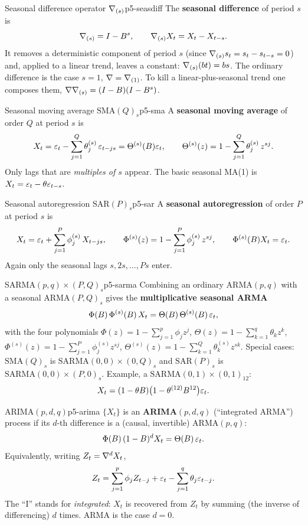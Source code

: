 \begin{definition}{Seasonal difference operator $\nabla_{(s)}$}{p5-seasdiff}
The \textbf{seasonal difference} of period $s$ is
\[
\nabla_{(s)}=I-B^{s},\qquad \nabla_{(s)}X_t=X_t-X_{t-s}.
\]
It removes a deterministic component of period $s$ (since
$\nabla_{(s)}s_t=s_t-s_{t-s}=0$) and, applied to a linear trend, leaves a
constant: $\nabla_{(s)}(bt)=bs$. The ordinary difference is the case $s=1$,
$\nabla=\nabla_{(1)}$. To kill a linear-plus-seasonal trend one composes them,
$\nabla\nabla_{(s)}=(I-B)(I-B^{s})$.
\end{definition}

\begin{definition}{Seasonal moving average $\mathrm{SMA}(Q)_s$}{p5-sma}
A \textbf{seasonal moving average} of order $Q$ at period $s$ is
\[
X_t=\varepsilon_t-\sum_{j=1}^{Q}\theta^{(s)}_j\,\varepsilon_{t-js}
=\Theta^{(s)}(B)\varepsilon_t,
\qquad
\Theta^{(s)}(z)=1-\sum_{j=1}^{Q}\theta^{(s)}_j\,z^{sj}.
\]
Only lags that are \emph{multiples of $s$} appear. The basic seasonal MA(1) is
$X_t=\varepsilon_t-\theta\varepsilon_{t-s}$.
\end{definition}

\begin{definition}{Seasonal autoregression $\mathrm{SAR}(P)_s$}{p5-sar}
A \textbf{seasonal autoregression} of order $P$ at period $s$ is
\[
X_t=\varepsilon_t+\sum_{j=1}^{P}\phi^{(s)}_j\,X_{t-js},
\qquad
\Phi^{(s)}(z)=1-\sum_{j=1}^{P}\phi^{(s)}_j\,z^{sj},
\qquad
\Phi^{(s)}(B)X_t=\varepsilon_t .
\]
Again only the seasonal lags $s,2s,\dots,Ps$ enter.
\end{definition}

\begin{definition}{SARMA$(p,q)\times(P,Q)_s$}{p5-sarma}
Combining an ordinary $\mathrm{ARMA}(p,q)$ with a seasonal
$\mathrm{ARMA}(P,Q)_s$ gives the \textbf{multiplicative seasonal ARMA}
\[
\Phi(B)\,\Phi^{(s)}(B)\,X_t=\Theta(B)\,\Theta^{(s)}(B)\,\varepsilon_t,
\]
with the four polynomials
\(\Phi(z)=1-\sum_{j=1}^p\phi_jz^j\),
\(\Theta(z)=1-\sum_{k=1}^q\theta_kz^k\),
\(\Phi^{(s)}(z)=1-\sum_{j=1}^P\phi^{(s)}_jz^{sj}\),
\(\Theta^{(s)}(z)=1-\sum_{k=1}^Q\theta^{(s)}_kz^{sk}\).
Special cases: $\mathrm{SMA}(Q)_s$ is $\mathrm{SARMA}(0,0)\times(0,Q)_s$ and
$\mathrm{SAR}(P)_s$ is $\mathrm{SARMA}(0,0)\times(P,0)_s$. Example, a
$\mathrm{SARMA}(0,1)\times(0,1)_{12}$:
\[
X_t=(1-\theta B)\bigl(1-\theta^{(12)}B^{12}\bigr)\varepsilon_t .
\]
\end{definition}

\begin{definition}{ARIMA$(p,d,q)$}{p5-arima}
$\{X_t\}$ is an \textbf{ARIMA$(p,d,q)$} (``integrated ARMA'') process if its
$d$-th difference is a (causal, invertible) $\mathrm{ARMA}(p,q)$:
\[
\Phi(B)\,(1-B)^{d}X_t=\Theta(B)\,\varepsilon_t .
\]
Equivalently, writing $Z_t=\nabla^{d}X_t$,
\[
Z_t=\sum_{j=1}^{p}\phi_jZ_{t-j}+\varepsilon_t-\sum_{j=1}^{q}\theta_j\varepsilon_{t-j}.
\]
The ``I'' stands for \emph{integrated}: $X_t$ is recovered from $Z_t$ by summing
(the inverse of differencing) $d$ times. ARMA is the case $d=0$.
\end{definition}

